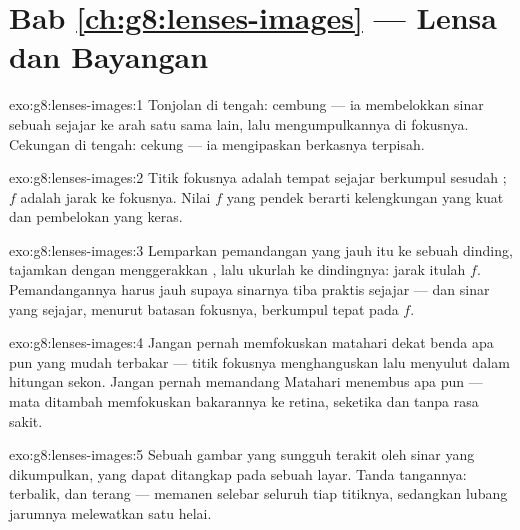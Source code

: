 \section*{Bab \ref{ch:g8:lenses-images} --- Lensa dan Bayangan}

\begin{solution}{exo:g8:lenses-images:1}
Tonjolan di tengah: cembung --- ia membelokkan sinar sebuah 
sejajar ke arah satu sama lain, lalu mengumpulkannya di fokusnya.
Cekungan di tengah: cekung --- ia mengipaskan berkasnya terpisah.
\end{solution}

\begin{solution}{exo:g8:lenses-images:2}
Titik fokusnya adalah tempat  sejajar berkumpul sesudah
;  $f$ adalah jarak  ke fokusnya. Nilai $f$
yang pendek berarti kelengkungan yang kuat dan pembelokan yang keras.
\end{solution}

\begin{solution}{exo:g8:lenses-images:3}
Lemparkan  pemandangan yang jauh itu ke sebuah dinding,
tajamkan dengan menggerakkan , lalu ukurlah  ke
dindingnya: jarak itulah $f$. Pemandangannya harus jauh supaya
sinarnya tiba praktis sejajar --- dan sinar yang sejajar, menurut
batasan fokusnya, berkumpul tepat pada $f$.
\end{solution}

\begin{solution}{exo:g8:lenses-images:4}
Jangan pernah memfokuskan  matahari dekat benda apa pun yang
mudah terbakar --- titik fokusnya menghanguskan lalu menyulut dalam
hitungan sekon. Jangan pernah memandang Matahari menembus  apa
pun --- mata ditambah  memfokuskan bakarannya ke retina,
seketika dan tanpa rasa sakit.
\end{solution}

\begin{solution}{exo:g8:lenses-images:5}
Sebuah gambar yang sungguh terakit oleh sinar yang dikumpulkan, yang
dapat ditangkap pada sebuah layar. Tanda tangannya: terbalik, dan
terang ---  memanen  selebar seluruh  tiap
titiknya, sedangkan lubang jarumnya melewatkan satu helai.
\end{solution}


